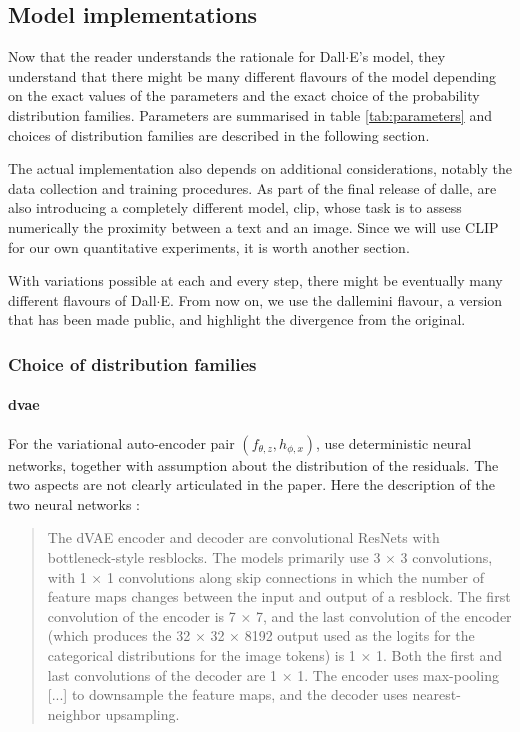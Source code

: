 \documentclass{article}
\begin{document}
\begin{multicols}{2}
\subsection{Model implementations}

Now that the reader understands the rationale for Dall$\cdot$E's model, they understand that there might be many different flavours of the model depending on the exact values of the parameters and the exact choice of the probability distribution families. Parameters are summarised in table \ref{tab:parameters} and choices of distribution families are described in the following section.

The actual implementation also depends on additional considerations, notably the data collection and training procedures. As part of the final release of \gls{dalle}, \citeauthor{zeroshot} are also introducing a completely different model, \gls{clip}, whose task is to assess numerically the proximity between a text and an image. Since we will use CLIP for our own quantitative experiments, it is worth another section.

With variations possible at each and every step, there might be eventually many different flavours of Dall$\cdot$E. From now on, we use the \gls{dallemini} flavour, a version that has been made public, and highlight the divergence from the original.

\subsubsection{Choice of distribution families}

\paragraph{\gls{dvae}} \label{sec:dvae}

For the variational auto-encoder pair $(f_{\theta,z}, h_{\phi,x})$, \citeauthor{zeroshot} use deterministic neural networks, together with assumption about the distribution of the residuals. The two aspects are not clearly articulated in the paper. Here the description of the two neural networks :

\blockquote{The dVAE encoder and decoder are convolutional ResNets with bottleneck-style resblocks. The models primarily use 3 × 3 convolutions, with 1 × 1 convolutions along skip connections in which the number of feature maps changes between the input and output of a resblock. The first convolution of the encoder is 7 × 7, and the last convolution of the encoder (which produces the 32 × 32 × 8192 output used as the logits for the categorical distributions for the image tokens) is 1 × 1. Both the first and last convolutions of the decoder are 1 × 1. The encoder uses max-pooling [...] to downsample the feature maps, and the decoder uses nearest-neighbor upsampling.}


\end{multicols}
\end{document}
